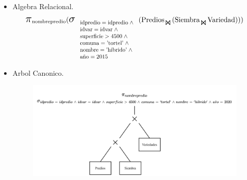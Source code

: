 \documentclass{templateNote}
\begin{document}
\begin{enumerate}
\begin{itemize}
        \item Algebra Relacional.
        \begin{align*}
            \scalebox{1.5}{$\pi$}_{\text{nombrepredio}} (
                \scalebox{1.5}{$\sigma$}_{
                    \scalebox{0.8}{
                        $\begin{array}{l}
                            \text{idpredio} = \text{idpredio} \; \wedge \\
                            \text{idvar} = \text{idvar} \; \wedge \\
                            \text{superficie} > 4500 \; \wedge \\
                            \text{comuna} = \text{'tortel'} \; \wedge \\
                            \text{nombre} = \text{'hibrido'} \; \wedge \\
                            \text{a\~no} = 2015
                        \end{array}$
                    }
                } (
                    \text{Predios}_{\scalebox{1.3}{$\Join$}} (
                        \text{Siembra}_{\scalebox{1.3}{$\Join$}} \text{Variedad}
                    )
                )
            )
        \end{align*}
        
        \newpage
        \item Arbol Canonico.
        \begin{figure}[H]
            \centering
            \includegraphics[width=\textwidth]{img/E2-Canonico.png}
        \end{figure}


\end{itemize}
\end{enumerate}
\end{document}
